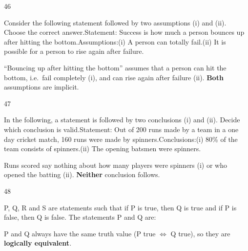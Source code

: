 \begin{question}{46}
{Consider the following statement followed by two assumptions (i) and (ii). Choose the correct answer.\newline Statement: Success is how much a person bounces up after hitting the bottom.\newline Assumptions:\newline (i) A person can totally fail.\newline (ii) It is possible for a person to rise again after failure.\par}
\begin{explain}
``Bouncing up after hitting the bottom'' assumes that a person can hit the bottom, i.e.\ fail completely (i), and can rise again after failure (ii). \textbf{Both} assumptions are implicit.
\end{explain}
\end{question}

\begin{question}{47}
{In the following, a statement is followed by two conclusions (i) and (ii). Decide which conclusion is valid.\newline Statement: Out of 200 runs made by a team in a one day cricket match, 160 runs were made by spinners.\newline Conclusions:\newline (i) 80\% of the team consists of spinners.\newline (ii) The opening batsmen were spinners.\par}
\begin{explain}
Runs scored say nothing about how many players were spinners (i) or who opened the batting (ii). \textbf{Neither} conclusion follows.
\end{explain}
\end{question}

\begin{question}{48}
{P, Q, R and S are statements such that if P is true, then Q is true and if P is false, then Q is false. The statements P and Q are:\par}
\begin{explain}
P and Q always have the same truth value (P true $\Leftrightarrow$ Q true), so they are \textbf{logically equivalent}.
\end{explain}
\end{question}

